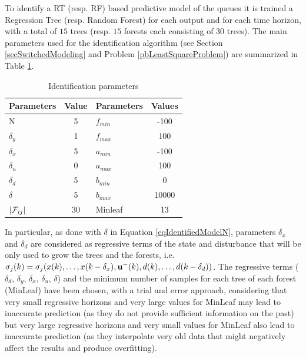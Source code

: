 To identify a RT (resp. RF) based predictive model of the queues it is trained a Regression Tree (resp. Random Forest) for each output and for each time horizon, with a total of $15$ trees (resp. $15$ forests each consisting of $30$ trees). The main parameters used for the identification algorithm (see Section \ref{secSwitchedModeling} and Problem \ref{pbLeastSquareProblem}) are summarized in Table \ref{tab:idPar}.  
\begin{table}[h!]
	\caption{Identification parameters}
	\centering
	\begin{tabular}{l c l c}
		\hline\hline
		Parameters & Value & Parameters & Values\\ 
		\hline
		N          & 5   & $f_{min}$  & -100 \\
		$\delta_y$ & 1   & $f_{max}$  & 100  \\
		$\delta_x$ & 5   & $a_{min}$  & -100  \\
		$\delta_u$ & 0   & $a_{max}$  & 100 \\
		$\delta_d$ & 5   & $b_{min}$  & 0  \\
		$\delta$   & 5   & $b_{max}$  & 10000  \\
		$|\mathcal{F}_{ij}|$   & 30  & Minleaf    & 13\\
		\hline
	\end{tabular}
	\label{tab:idPar}
\end{table}
{In particular, as done with $\delta$ in Equation \eqref{eqIdentifiedModelN}, parameters $\delta_x$ and $\delta_d$ are considered as regressive terms of the state and disturbance that will be only used to grow the trees and the forests, i.e. $\sigma_j(k) = \sigma_j(x(k),\ldots,x(k-\delta_x),\bold{u^-}(k),d(k),\ldots,d(k-\delta_d))$. The regressive terms ($\delta_d$, $\delta_y$, $\delta_x$, $\delta_u$, $\delta$)} and the minimum number of samples for each tree of each forest (MinLeaf) have been chosen, with a trial and error approach, considering that very small regressive horizons and very large values for MinLeaf may lead to inaccurate prediction (as they do not provide sufficient information on the past) but very large regressive horizons and very small values for MinLeaf also lead to inaccurate prediction (as they interpolate very old data that might negatively affect the results and produce overfitting).


